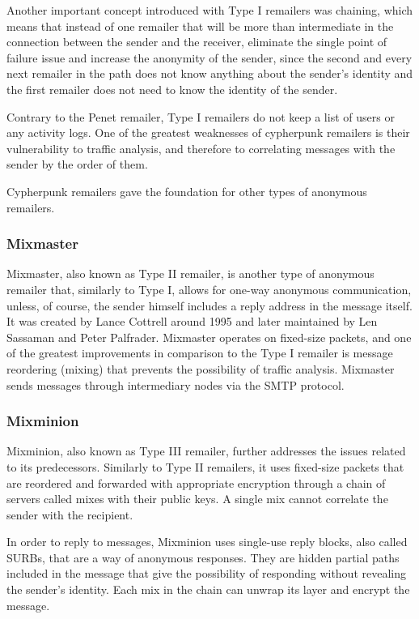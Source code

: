 Another important concept introduced with Type I remailers was chaining, which means that instead of one remailer that will be more than intermediate in the connection between the sender and the receiver, eliminate the single point of failure issue and increase the anonymity of the sender, since the second and every next remailer in the path does not know anything about the sender’s identity and the first remailer does not need to know the identity of the sender.

Contrary to the Penet remailer, Type I remailers do not keep a list of users or any activity logs.
One of the greatest weaknesses of cypherpunk remailers is their vulnerability to traffic analysis, and therefore to correlating messages with the sender by the order of them.

Cypherpunk remailers gave the foundation for other types of anonymous remailers.

\subsubsection{Mixmaster}
Mixmaster, also known as Type II remailer, is another type of anonymous remailer that, similarly to Type I, allows for one-way anonymous communication, unless, of course, the sender himself includes a reply address in the message itself. It was created by Lance Cottrell around 1995 and later maintained by Len Sassaman and Peter Palfrader. Mixmaster operates on fixed-size packets, and one of the greatest improvements in comparison to the Type I remailer is message reordering (mixing) that prevents the possibility of traffic analysis. Mixmaster sends messages through intermediary nodes via the SMTP protocol.

\subsubsection{Mixminion}
Mixminion, also known as Type III remailer, further addresses the issues related to its predecessors. Similarly to Type II remailers, it uses fixed-size packets that are reordered and forwarded with appropriate encryption through a chain of servers called mixes with their public keys. A single mix cannot correlate the sender with the recipient. 

In order to reply to messages, Mixminion uses single-use reply blocks, also called SURBs, that are a way of anonymous responses. They are hidden partial paths included in the message that give the possibility of responding without revealing the sender’s identity. Each mix in the chain can unwrap its layer and encrypt the message.

